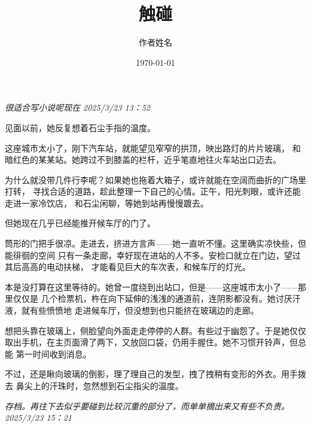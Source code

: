 \documentclass[12pt,openany]{book}  %
\title{触碰}
\author{作者姓名}
\date{\today}
\begin{document}
\maketitle
\newpage

\chapter*{}

\textit{很适合写小说呢现在 2025/3/23 13：52}

见面以前，她反复想着石尘手指的温度。

这座城市太小了，刚下汽车站，就能望见窄窄的拱顶，映出路灯的片片玻璃，
和暗红色的某某站。她跨过不到膝盖的栏杆，近乎笔直地往火车站出口迈去。

为什么就没带几件行李呢？如果她也拖着大箱子，或许就能在空阔而曲折的广场里打转，
寻找合适的道路，趁此整理一下自己的心情。正午，阳光刺眼，或许还能走进一家冷饮店，
和石尘闲聊，等她到站再慢慢踱去。

但她现在几乎已经能推开候车厅的门了。

筒形的门把手很凉。走进去，挤进方言声——她一直听不懂。这里确实凉快些，但能徘徊的空间
只有一条走廊，幸好现在进站的人不多。安检口就立在门边，望过其后高高的电动扶梯，
才能看见巨大的车次表，和候车厅的灯光。

本是没打算在这里等待的。她曾一度绕到出站口，但是——这座城市太小了——那里仅仅是
几个检票机，杵在向下延伸的浅浅的通道前，连阴影都没有。她讨厌汗液，就有些愤愤地
走进候车厅，但没想到也只能挤在玻璃边的走廊。

想把头靠在玻璃上，侧脸望向外面走走停停的人群。有些过于幽怨了。于是她仅仅
取出手机，在主页面滑了两下，又放回口袋，仍用手握住。她不习惯开铃声，但总能
第一时间收到消息。

不过，还是瞅向玻璃的倒影，理了理自己的发型，拽了拽稍有变形的外衣。用手拨去
鼻尖上的汗珠时，忽然想到石尘指尖的温度。

\textit{存档。再往下去似乎要碰到比较沉重的部分了，而单单摘出来又有些不负责。2025/3/23 15：21}
\end{document}
